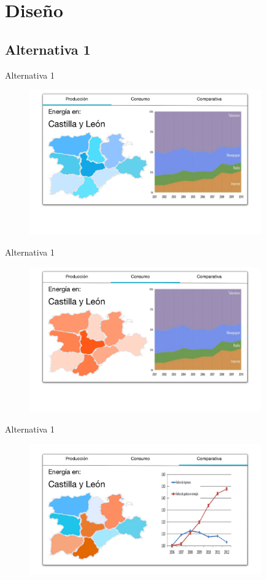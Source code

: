 \documentclass{beamer}
\begin{document}
	\section{Diseño}
	
		\subsection{Alternativa 1}
		
			\begin{frame}{Alternativa 1}
				\begin{figure}[H]
					\centering
					\includegraphics[width=100mm]{../res/design2-1.png}
				\end{figure}
			\end{frame}
			
			\begin{frame}{Alternativa 1}
				\begin{figure}[H]
					\centering
					\includegraphics[width=100mm]{../res/design2-2.png}
				\end{figure}
			\end{frame}
			
			\begin{frame}{Alternativa 1}
				\begin{figure}[H]
					\centering
					\includegraphics[width=100mm]{../res/design2-3.png}
				\end{figure}
			\end{frame}
		
\end{document}
